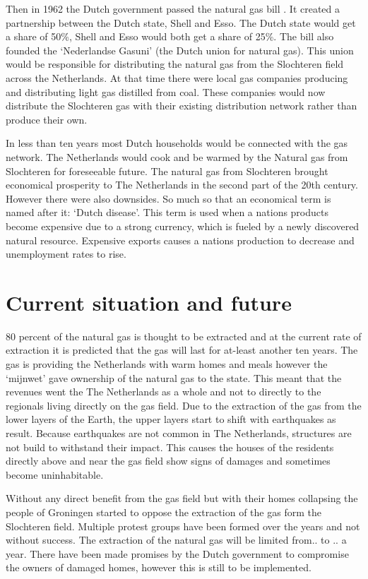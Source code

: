 Then in 1962 the Dutch government passed the natural gas bill . It created a partnership between the Dutch state, Shell and Esso. The Dutch state would get a share of 50\%, Shell and Esso would both get a share of 25\%. The bill also founded the `Nederlandse Gasuni' (the Dutch union for natural gas). This union would be responsible for distributing the natural gas from the Slochteren field across the Netherlands. At that time there were local gas companies  producing and distributing light gas distilled from coal. These companies would now distribute the Slochteren gas with their existing distribution network rather than produce their own.

In less than ten years most Dutch households would be connected with the gas network. The Netherlands would cook and be warmed by the Natural gas from Slochteren for foreseeable future.  The natural gas from Slochteren brought economical prosperity to The Netherlands in the second part of the 20th century. However there were also downsides. So much so that an economical term is named after it: `Dutch disease'.  This term is used when a nations products become expensive due to a strong currency, which is fueled by a newly discovered natural resource. Expensive exports causes a nations production to decrease and unemployment rates to rise.

\section{Current situation and future}

80 percent of the natural gas is thought to be extracted and at the current rate of extraction it is predicted that the gas will last for at-least another ten years. The gas is providing the Netherlands with warm homes and meals however the `mijnwet' gave ownership of the natural gas to the state. This meant that the revenues went the The Netherlands as a whole and not to directly to the regionals living directly on the gas field. Due to the extraction of the gas from the lower layers of the Earth, the upper layers start to shift with earthquakes as result. Because earthquakes are not common in The Netherlands, structures are not build to withstand their impact. This causes the houses of the residents directly above and near the gas field show signs of damages and sometimes become uninhabitable.

Without any direct benefit from the gas field but with their homes collapsing the people of Groningen started to oppose the extraction of the gas form the Slochteren field. Multiple protest groups have been formed over the years and not without success. The extraction of the natural gas will be limited from.. to .. a year. There have been made promises by the Dutch government to compromise the owners of damaged homes, however this is still to be implemented.

